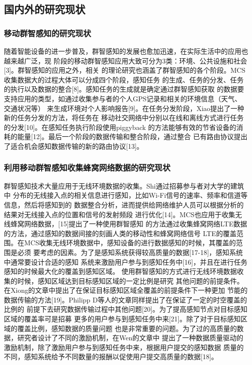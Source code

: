 \documentclass[UTF8]{ctexart}
\begin{document}
\subsection{国内外的研究现状}
\subsubsection{移动群智感知的研究现状}
随着智能设备的进一步普及，群智感知的发展也愈加迅速，在实际生活中的应用也越来越广泛，现
阶段的移动群智感知应用大致可分为3类：环境、公共设施和社会[3]。群智感知的应用之外，相关
的理论研究也涵盖了群智感知的各个阶段。MCS收集数据大的过程大体可以分成四个阶段，感知任务
的生成、任务的分发、任务的执行以及数据的整合[8]。感知任务的生成就是确定通过群智感知获取
的数据要支持应用的类型，如通过收集参与者的个人GPS记录和相关的环境信息（天气、交通状况等）
来生成环境对个人影响报告[9]。在任务分发阶段，Xiao提出了一种新的任务分发的方法，将任务在
移动社交网络中分别以在线和离线方式进行任务的分发[10]。在感知任务执行阶段使用piggyback
的方法能够有效的节省设备的消耗的能量[12]。最后一个阶段的数据传输和整合阶段，通过整合
已有路由协议提出了适合机会感知数据传输的新的路由协议[13]。

\subsubsection{利用移动群智感知收集蜂窝网络数据的研究现状}
群智感知技术大量应用于无线环境数据的收集。Shi通过招募参与者对大学的建筑中
分布的无线接入点的相关信息进行感知，比如Wi-Fi信号的速率、频率和信道等信息，然后将感知到的
数据整合分析，进而提供给网络维护人员可以根据分析的结果对无线接入点的位置和信号的发射频段
进行优化[14]。MCS也应用于收集无线蜂窝网络数据，[15]提出了一种使用群智感知
的方法通过收集蜂窝网络LTE数据的方法，通过感知的数据间接的刻画人类的移动性和蜂窝网络信号
LTE的覆盖范围。在MCS收集无线环境数据中，感知设备的进行数据感知的时候，其覆盖的范围是必须
要考虑的因素。为了是感知系统获得较高质量的数据[17-18]，感知系统中通常要设计合适的感知
系统来激励用户参与到感知任务中[16]，并且在进行任务感知的时候最大化的覆盖到感知区域。
使用群智感知的方式进行无线环境数据收集的时候，感知区域达到目标感知区域的一定比例是研究
其他问题的前提条件。在Xiong的文章中提出了在保证目标感知区域全覆盖的前提条件下一种更加
节能的数据传输的方法[19]。Philipp D等人的文章同样提出了在保证了一定的时空覆盖的比例的
前提下去研究数据传输过程中其他问题[20]。为了提高感知节点对目标感知区域的覆盖率可是招募
更多的用户参与到感知任务中来[21]。除了对于目标感知区域的覆盖比例，感知数据的质量问题
也是非常重要的问题。为了过的高质量的数据，研究者设计了不同的激励机制，在Wen的文章中
提出了一种数据质量驱动的激励机制，除了激励用户参与到感知任务中来，根据用户提交的感知数据
质量的不同，感知系统给予不同数量的报酬以促使用户提交高质量的数据[18]。
\end{document}
